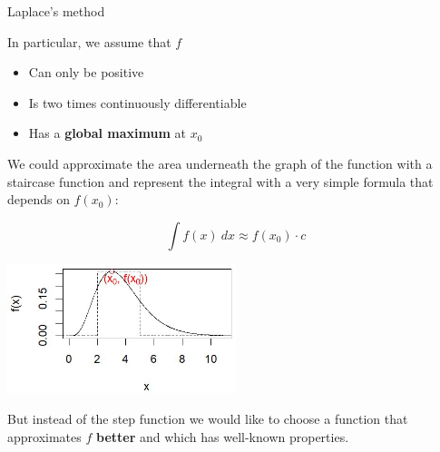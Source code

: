 \documentclass[11pt,compress,t,notes=noshow, xcolor=table]{beamer}
\begin{document}
\begin{vbframe}{Laplace's method}




\framebreak
In particular, we assume that $f$

\begin{itemize}
\item Can only be positive
\item Is two times continuously differentiable
\item Has a \textbf{global maximum} at $x_0$
\end{itemize}


\vspace*{0.1cm}
We could approximate the area underneath the graph of the function with a staircase function and represent the integral with a very simple formula that depends on $f(x_0)$:
\vspace*{-0.1cm}
\begin{footnotesize}
$$
\int f(x)~dx \approx f(x_0) \cdot c
$$

\begin{center}
\includegraphics[width =0.5\textwidth]{figure_man/normaldist2.png}
\end{center}


\end{footnotesize}

\framebreak

But instead of the step function we would like to choose a function that approximates $f$ \textbf{better} and which has well-known properties.


\end{vbframe}
\end{document}

